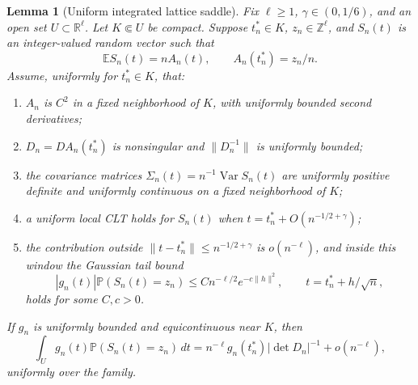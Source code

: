 \documentclass[11pt]{article}
\newtheorem{lemma}[theorem]{Lemma}
\theoremstyle{remark}
\newcommand{\Pp}{\mathbb P}
\newcommand{\Ee}{\mathbb E}
\newcommand{\Rr}{\mathbb R}
\newcommand{\Var}{\operatorname{Var}}
\newcommand{\dd}{\,d}
\begin{document}
\begin{lemma}[Uniform integrated lattice saddle]\label{lem:integrated-lattice-saddle}
Fix \(\ell\ge1\), \(\gamma\in(0,1/6)\), and an open set \(U\subset\Rr^\ell\).  Let \(K\Subset U\) be compact.  Suppose \(t_n^*\in K\), \(z_n\in\mathbb Z^\ell\), and \(S_n(t)\) is an integer-valued random vector such that
\[
        \Ee S_n(t)=nA_n(t),\qquad A_n(t_n^*)=z_n/n.
\]
Assume, uniformly for \(t_n^*\in K\), that:
\begin{enumerate}
\item \(A_n\) is \(C^2\) in a fixed neighborhood of \(K\), with uniformly bounded second derivatives;
\item \(D_n=DA_n(t_n^*)\) is nonsingular and \(\|D_n^{-1}\|\) is uniformly bounded;
\item the covariance matrices \(\Sigma_n(t)=n^{-1}\Var S_n(t)\) are uniformly positive definite and uniformly continuous on a fixed neighborhood of \(K\);
\item a uniform local CLT holds for \(S_n(t)\) when \(t=t_n^*+O(n^{-1/2+\gamma})\);
\item the contribution outside \(\|t-t_n^*\|\le n^{-1/2+\gamma}\) is \(o(n^{-\ell})\), and inside this window the Gaussian tail bound
\[
        |g_n(t)|\Pp(S_n(t)=z_n)\le C n^{-\ell/2}e^{-c\|h\|^2},
        \qquad t=t_n^*+h/\sqrt n,
\]
holds for some \(C,c>0\).
\end{enumerate}
If \(g_n\) is uniformly bounded and equicontinuous near \(K\), then
\[
        \int_U g_n(t)\Pp(S_n(t)=z_n)\dd t
        =n^{-\ell}g_n(t_n^*)|\det D_n|^{-1}+o(n^{-\ell}),
\]
uniformly over the family.
\end{lemma}
\end{document}
